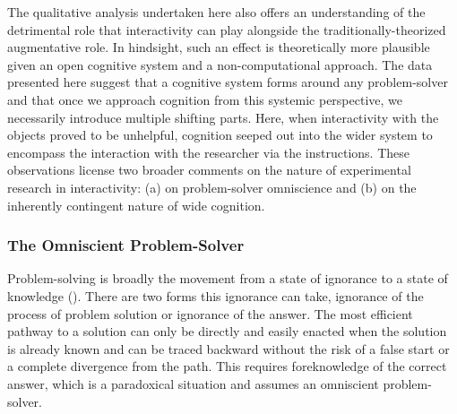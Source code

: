 \documentclass[twocolumn, serif, empirical, authordate]{jote-article}
\begin{document}
{{The qualitative analysis undertaken here also offers an understanding of the detrimental role that interactivity can play alongside the traditionally-theorized augmentative role. In hindsight, such an effect is theoretically more plausible given an open cognitive system and a non-computational approach. The data presented here suggest that a cognitive system forms around any problem-solver and that once we approach cognition from this systemic perspective, we necessarily introduce multiple shifting parts. Here, when interactivity with the objects proved to be unhelpful, cognition seeped out into the wider system to encompass the interaction with the researcher via the instructions. These observations license two broader comments on the nature of experimental research in interactivity: (a) on problem-solver omniscience and (b) on the inherently contingent nature of wide cognition.


\subsubsection{The Omniscient Problem-Solver}

Problem-solving is broadly the movement from a state of ignorance to a state of knowledge (). There are two forms this ignorance can take, ignorance of the process of problem solution or ignorance of the answer. The most efficient pathway to a solution can only be directly and easily enacted when the solution is already known and can be traced backward without the risk of a false start or a complete divergence from the path. This requires foreknowledge of the correct answer, which is a paradoxical situation and assumes an omniscient problem-solver.

}}
\end{document}
